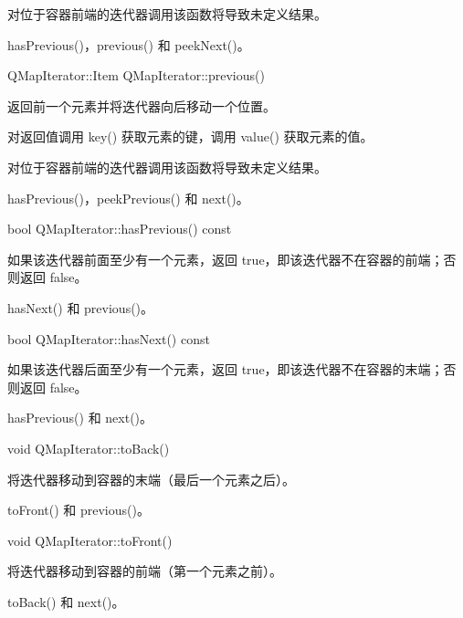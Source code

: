对位于容器前端的迭代器调用该函数将导致未定义结果。

\begin{notice}[另请参阅]
hasPrevious()，previous() 和 peekNext()。
\end{notice}

\splitLine

QMapIterator::Item QMapIterator::previous()

返回前一个元素并将迭代器向后移动一个位置。

对返回值调用 key() 获取元素的键，调用 value() 获取元素的值。

对位于容器前端的迭代器调用该函数将导致未定义结果。


\begin{notice}[另请参阅]
hasPrevious()，peekPrevious() 和 next()。
\end{notice}

\splitLine

bool QMapIterator::hasPrevious() const

如果该迭代器前面至少有一个元素，返回 true，即该迭代器不在容器的前端；否则返回 false。

\begin{notice}[另请参阅]
hasNext() 和 previous()。
\end{notice}

\splitLine

bool QMapIterator::hasNext() const

如果该迭代器后面至少有一个元素，返回 true，即该迭代器不在容器的末端；否则返回 false。

\begin{notice}[另请参阅]
hasPrevious() 和 next()。
\end{notice}

\splitLine

void QMapIterator::toBack()

将迭代器移动到容器的末端（最后一个元素之后）。

\begin{notice}[另请参阅]
toFront() 和 previous()。
\end{notice}

\splitLine

void QMapIterator::toFront()

将迭代器移动到容器的前端（第一个元素之前）。

\begin{notice}[另请参阅]
toBack() 和 next()。
\end{notice}

\splitLine

